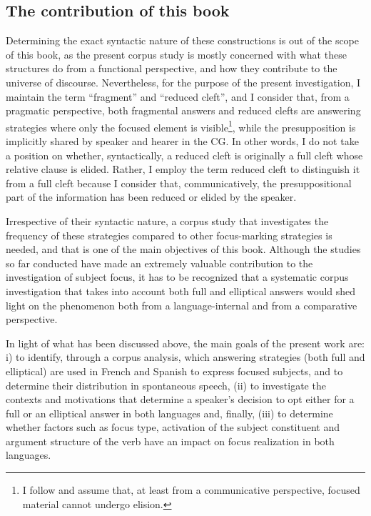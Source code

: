 \subsection{The contribution of this book} \label{sub:3.4.3}
Determining the exact syntactic nature of these constructions is out of the scope of this book, as the present corpus study is mostly concerned with what these structures do from a functional perspective, and how they contribute to the universe of discourse. Nevertheless, for the purpose of the present investigation, I maintain the term ``fragment” and ``reduced cleft”, and I consider that, from a pragmatic perspective, both fragmental answers and reduced clefts are answering strategies where only the focused element is visible\footnote{I follow \textcite{yoshida2013predictive} and assume that, at least from a communicative perspective, focused material cannot undergo elision.
}, while the presupposition is implicitly shared by speaker and hearer in the CG. In other words, I do not take a position on whether, syntactically, a reduced cleft is originally a full cleft whose relative clause is elided. Rather, I employ the term reduced cleft to distinguish it from a full cleft because I consider that, communicatively, the presuppositional part of the information has been reduced or elided by the speaker.

Irrespective of their syntactic nature, a corpus study that investigates the frequency of these strategies compared to other focus-marking strategies is needed, and that is one of the main objectives of this book.
Although the studies so far conducted have made an extremely valuable contribution  to the investigation of subject focus, it has to be recognized that a systematic corpus investigation that takes into account both full and elliptical answers would shed light on the phenomenon both from a language-internal and from a comparative perspective. 

In light of what has been discussed above, the main goals of the present work are: i) to identify, through a corpus analysis, which answering strategies (both full and elliptical) are used in French and Spanish to express focused subjects, and to determine their distribution in spontaneous speech, (ii) to investigate the contexts and motivations that determine a speaker's decision to opt either for a full or an elliptical answer in both languages and, finally, (iii) to determine whether factors such as focus type, activation of the subject constituent and argument structure of the verb have an impact on focus realization in both languages.
